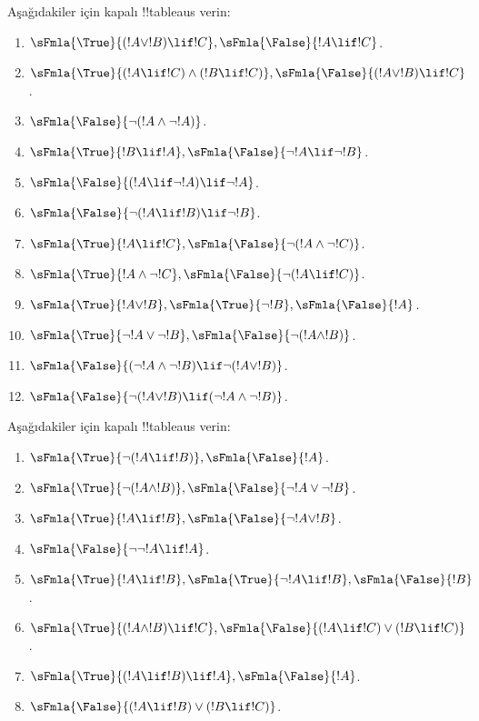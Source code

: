\documentclass[../../../include/open-logic-section]{subfiles}
\begin{document}
\begin{prob}
Aşağıdakiler için kapalı !!{tableau}s verin:
\begin{enumerate}
\item $\sFmla{\True}{(!A \lor !B) \lif !C}, \sFmla{\False}{!A \lif !C}$.
\item $\sFmla{\True}{(!A \lif !C) \land (!B \lif !C)}, \sFmla{\False}{(!A \lor !B) \lif !C}$.
\item $\sFmla{\False}{\lnot(!A \land \lnot !A)}$.
\item $\sFmla{\True}{!B \lif !A}, \sFmla{\False}{\lnot !A \lif \lnot !B}$.
\item $\sFmla{\False}{(!A \lif \lnot !A) \lif \lnot !A}$.
\item $\sFmla{\False}{\lnot(!A \lif !B) \lif \lnot !B}$.
\item $\sFmla{\True}{!A \lif !C}, \sFmla{\False}{\lnot (!A \land \lnot !C)}$.
\item $\sFmla{\True}{!A \land \lnot !C}, \sFmla{\False}{\lnot (!A \lif !C)}$.
\item $\sFmla{\True}{!A \lor !B}, \sFmla{\True}{\lnot !B}, \sFmla{\False}{!A}$.
\item $\sFmla{\True}{\lnot !A \lor \lnot !B}, \sFmla{\False}{\lnot(!A \land !B)}$.
\item $\sFmla{\False}{(\lnot !A \land \lnot !B) \lif\lnot(!A \lor !B)}$.
\item $\sFmla{\False}{\lnot(!A \lor !B) \lif (\lnot !A \land \lnot !B)}$.
\end{enumerate}
\end{prob}

\begin{prob}
Aşağıdakiler için kapalı !!{tableau}s verin:
\begin{enumerate}
\item $\sFmla{\True}{\lnot(!A \lif !B)}, \sFmla{\False}{!A}$.
\item $\sFmla{\True}{\lnot(!A \land !B)}, \sFmla{\False}{\lnot !A \lor \lnot !B}$.
\item $\sFmla{\True}{!A \lif !B}, \sFmla{\False}{\lnot !A \lor !B}$.
\item $\sFmla{\False}{\lnot \lnot !A \lif !A}$.
\item $\sFmla{\True}{!A \lif !B}, \sFmla{\True}{\lnot !A \lif !B}, \sFmla{\False}{!B}$.
\item $\sFmla{\True}{(!A \land !B) \lif !C}, \sFmla{\False}{(!A \lif !C) \lor (!B \lif !C)}$.
\item $\sFmla{\True}{(!A \lif !B) \lif !A}, \sFmla{\False}{!A}$.
\item $\sFmla{\False}{(!A \lif !B) \lor (!B \lif !C)}$.
\end{enumerate}
\end{prob}
\end{document}
